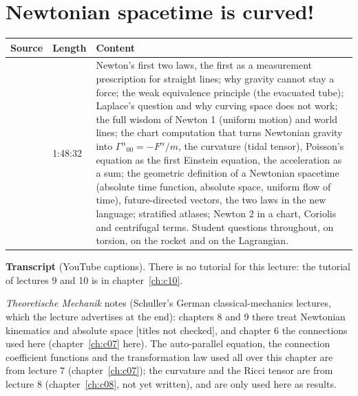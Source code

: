 \chapter{Newtonian spacetime is curved!}\label{ch:c09}
\begin{paracol}{2}

\begin{sources}
\begin{tabularx}{\linewidth}{@{}l l L@{}}
\toprule
\textbf{Source} & \textbf{Length} & \textbf{Content}\\
\midrule
{} & 1:48:32 & Newton's first two laws, the first as a measurement prescription for straight lines; why gravity cannot stay a force; the weak equivalence principle (the evacuated tube); Laplace's question and why curving space does not work; the full wisdom of Newton 1 (uniform motion) and world lines; the chart computation that turns Newtonian gravity into $\Gamma^\alpha{}_{00}=-F^\alpha/m$, the curvature (tidal tensor), Poisson's equation as the first Einstein equation, the acceleration as a sum; the geometric definition of a Newtonian spacetime (absolute time function, absolute space, uniform flow of time), future-directed vectors, the two laws in the new language; stratified atlases; Newton 2 in a chart, Coriolis and centrifugal terms. Student questions throughout, on torsion, on the rocket and on the Lagrangian.\\
\bottomrule
\end{tabularx}

\smallskip
\textbf{Transcript}  (YouTube captions). There is no tutorial for this lecture: the tutorial of lectures 9 and 10 is in chapter~\ref{ch:c10}.
\end{sources}

\begin{reading}
\emph{Theoretische Mechanik} notes (Schuller's German classical-mechanics lectures, which the lecture advertises at the end): chapters 8 and 9 there treat Newtonian kinematics and absolute space [titles not checked], and chapter 6 the connections used here (chapter~\ref{ch:c07} here). The auto-parallel equation, the connection coefficient functions and the transformation law used all over this chapter are from lecture 7 (chapter~\ref{ch:c07}); the curvature and the Ricci tensor are from lecture 8 (chapter~\ref{ch:c08}, not yet written), and are only used here as results.
\end{reading}


\end{paracol}
